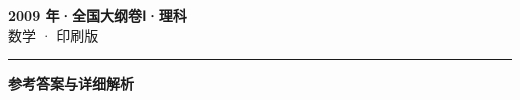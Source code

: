 \documentclass[zihao=5, a4paper]{ctexart}
\begin{document}
\begin{center}
  {\Large\bfseries 2009 年·全国大纲卷Ⅰ·理科}\\[4pt]
  {\large 数学 · 印刷版}
\end{center}
\medskip
{}

\par\bigskip\hrule\bigskip
{}
\begin{center}{\large\bfseries 参考答案与详细解析}\end{center}
\smallskip

\end{document}
